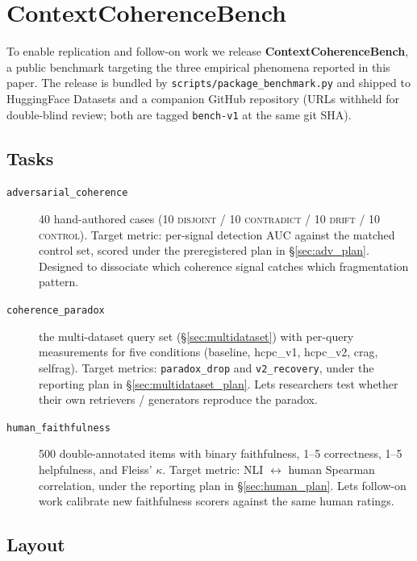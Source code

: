\section{ContextCoherenceBench}
\label{sec:benchmark}

To enable replication and follow-on work we release
\textbf{ContextCoherenceBench}, a public benchmark targeting the three
empirical phenomena reported in this paper. The release is bundled by
\texttt{scripts/package\_benchmark.py} and shipped to
HuggingFace Datasets and a companion GitHub repository (URLs withheld for
double-blind review; both are tagged \texttt{bench-v1} at the same git
SHA).

\subsection{Tasks}

\begin{description}
  \item[\texttt{adversarial\_coherence}] 40 hand-authored cases
        (10 \textsc{disjoint} / 10 \textsc{contradict} / 10
        \textsc{drift} / 10 \textsc{control}). Target metric: per-signal
        detection AUC against the matched control set, scored under the
        preregistered plan in §\ref{sec:adv_plan}. Designed to
        dissociate which coherence signal catches which fragmentation
        pattern.
  \item[\texttt{coherence\_paradox}] the multi-dataset query set
        (§\ref{sec:multidataset}) with per-query measurements for five
        conditions (baseline, hcpc\_v1, hcpc\_v2, crag, selfrag). Target
        metrics: \texttt{paradox\_drop} and \texttt{v2\_recovery}, under
        the reporting plan in §\ref{sec:multidataset_plan}. Lets
        researchers test whether their own retrievers / generators
        reproduce the paradox.
  \item[\texttt{human\_faithfulness}] 500 double-annotated items with
        binary faithfulness, 1--5 correctness, 1--5 helpfulness, and
        Fleiss' $\kappa$. Target metric: NLI $\leftrightarrow$ human
        Spearman correlation, under the reporting plan in
        §\ref{sec:human_plan}. Lets follow-on work calibrate new
        faithfulness scorers against the same human ratings.
\end{description}

\subsection{Layout}

